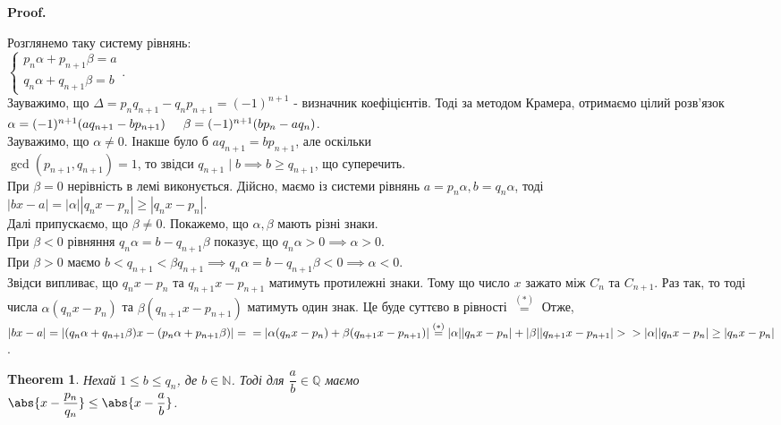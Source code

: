 \documentclass[a4paper, 14pt]{extarticle}
\makeatletter
\theoremstyle{theoremdd}
\newtheorem{theorem}{Theorem}[subsection]
\theoremstyle{theoremdd}
\theoremstyle{theoremdd}
\theoremstyle{theoremdd}
\theoremstyle{theoremdd}
\theoremstyle{theoremdd}
\theoremstyle{theoremdd}
\theoremstyle{theoremdd}
\def\qed{$\blacksquare$}
\renewenvironment{proof}[1][Proof.\\]{\par
\pushQED{\hfill \qed}%
\normalfont \topsep6\p@\@plus6\p@\relax
\trivlist
\item\relax
{\bfseries
#1\@addpunct{.}}\hspace\labelsep\ignorespaces
}{%
\popQED\endtrivlist\@endpefalse
}
\makeatother
\begin{document}
\begin{proof}
Розглянемо таку систему рівнянь:\\
$\begin{cases} 
p_n \alpha + p_{n+1} \beta = a \\
q_n \alpha + q_{n+1} \beta = b
\end{cases}$.\\
Зауважимо, що $\Delta = p_n q_{n+1}  -q_n p_{n+1} = (-1)^{n+1}$ - визначник коефіцієнтів. Тоді за методом Крамера, отримаємо цілий розв'язок\\
$\alpha = (-1)^{n+1}(aq_{n+1} - bp_{n+1}) \hspace{0.5cm} \beta = (-1)^{n+1}(bp_n - aq_n)$.\\
Зауважимо, що $\alpha \neq 0$. Інакше було б $aq_{n+1}  =bp_{n+1}$, але оскільки \\ $\gcd(p_{n+1},q_{n+1}) = 1$, то звідси $q_{n+1} \mid b \implies b \geq q_{n+1}$, що суперечить.\\
При $\beta = 0$ нерівність в лемі виконується. Дійсно, маємо із системи рівнянь $a = p_n \alpha, b = q_n \alpha$, тоді\\
$|bx-a| = |\alpha| |q_n x - p_n| \geq |q_n x - p_n|$.
\bigskip \\
Далі припускаємо, що $\beta \neq 0$. Покажемо, що $\alpha,\beta$ мають різні знаки. \\
При $\beta < 0$ рівняння $q_n \alpha = b - q_{n+1} \beta$ показує, що $q_n \alpha > 0 \implies \alpha > 0$. \\
При $\beta > 0$ маємо $b \iffalse \overset{\text{умова}}{<} \fi < q_{n+1} < \beta q_{n+1} \implies q_n \alpha  = b - q_{n+1}\beta < 0 \implies \alpha < 0$.\\
Звідси випливає, що $q_n x - p_n$ та $q_{n+1}x - p_{n+1}$ матимуть протилежні знаки. Тому що число $x$ зажато між $C_n$ та $C_{n+1}$. Раз так, то тоді числа $\alpha(q_n x - p_n)$ та $\beta(q_{n+1}x- p_{n+1})$ матимуть один знак. Це буде суттєво в рівності $\overset{(*)}{=}$ Отже,\\
$|bx - a | = |(q_n \alpha + q_{n+1} \beta)x - (p_n \alpha + p_{n+1} \beta)| = \\ =|\alpha (q_nx-p_n) + \beta(q_{n+1}x - p_{n+1})| \overset{(*)}{=} |\alpha| |q_nx-p_n| + |\beta| |q_{n+1}x - p_{n+1}| > \\ > |\alpha| |q_nx - p_n| \geq |q_n x - p_n|$.
\end{proof}

\begin{theorem}
Нехай $1 \leq b \leq q_n$, де $b \in \mathbb{N}$. Тоді для $\dfrac{a}{b} \in \mathbb{Q}$ маємо\\
$\abs{x - \dfrac{p_n}{q_n}} \leq \abs{x - \dfrac{a}{b}}$.
\end{theorem}
\end{document}
